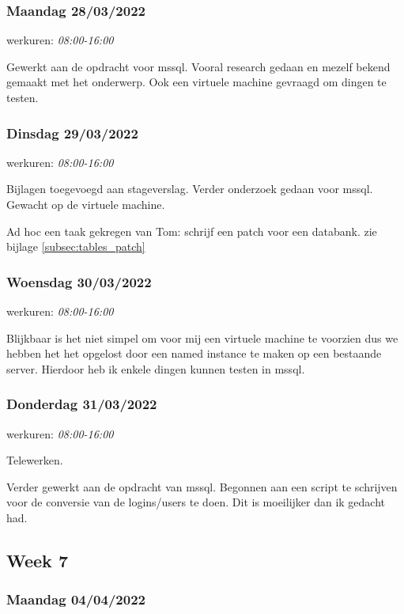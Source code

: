 \subsubsection{Maandag 28/03/2022}

werkuren: \emph{08:00-16:00}

Gewerkt aan de opdracht voor \gls{mssql}. Vooral research gedaan en mezelf
bekend gemaakt met het onderwerp. Ook een virtuele machine gevraagd om dingen te testen.


\subsubsection{Dinsdag 29/03/2022}

werkuren: \emph{08:00-16:00}

Bijlagen toegevoegd aan stageverslag. Verder onderzoek gedaan voor \gls{mssql}.
Gewacht op de virtuele machine.

Ad hoc een taak gekregen van Tom: schrijf een patch voor een databank. zie bijlage \ref{subsec:tables_patch}

\subsubsection{Woensdag 30/03/2022}

werkuren: \emph{08:00-16:00}

Blijkbaar is het niet simpel om voor mij een virtuele machine te voorzien dus we hebben het het opgelost door een named instance te maken op een bestaande server. Hierdoor heb ik enkele dingen kunnen testen in \gls{mssql}.

\subsubsection{Donderdag 31/03/2022}

werkuren: \emph{08:00-16:00}

Telewerken.

Verder gewerkt aan de opdracht van \gls{mssql}. Begonnen aan een script te schrijven voor de conversie van de logins/users te doen.  
Dit is moeilijker dan ik gedacht had.

\subsection{Week 7}

\subsubsection{Maandag 04/04/2022}


